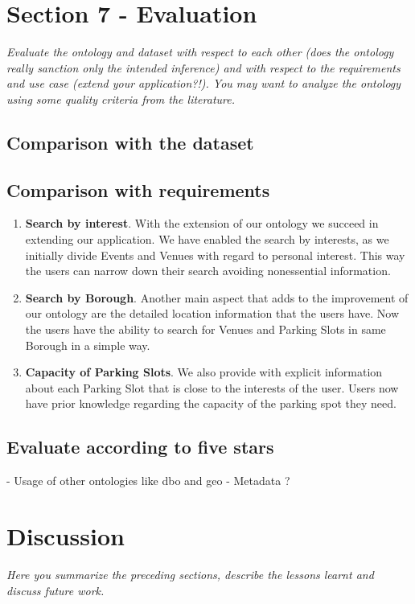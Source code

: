 \documentclass[runningheads,a4paper]{../../StyleFiles/llncs}
\begin{document}
\section{Section 7 - Evaluation}
\textit{Evaluate the ontology and dataset with respect to each other (does the ontology really sanction only the intended inference) and with respect to the requirements and use case (extend your application?!). You may want to analyze the ontology using some quality criteria from the literature.}

\subsection{Comparison with the dataset}

\subsection{Comparison with requirements}
\begin{enumerate}
	\item \textbf{Search by interest}.
	With the extension of our ontology we succeed in extending our application. We have enabled the search by interests, as we initially divide Events and Venues with regard to personal interest. This way the users can narrow down their search avoiding nonessential information.
	
	\item \textbf{Search by Borough}. Another main aspect that adds to the improvement of our ontology are the detailed location information that the users have. Now the users have the ability to search for Venues and Parking Slots in same Borough in a simple way.
	
	\item \textbf{Capacity of Parking Slots}. We also provide with explicit information about each Parking Slot that is close to the interests of the user. Users now have prior knowledge regarding the capacity of the parking spot they need.
\end{enumerate}

\subsection{Evaluate according to five stars}
- Usage of other ontologies like dbo and geo
- Metadata ?

\section{Discussion}
\textit{Here you summarize the preceding sections, describe the lessons learnt and discuss future work.}





\end{document}
